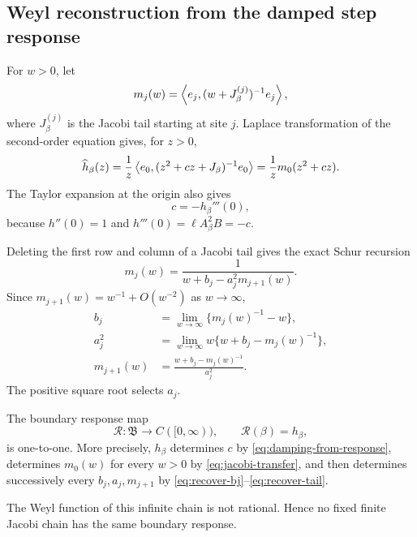 \subsection{Weyl reconstruction from the damped step response}

For \(w>0\), let
\[
 m_j(w)=\left\langle e_j,(w+J_\beta^{(j)})^{-1}e_j\right\rangle,
\]
where \(J_\beta^{(j)}\) is the Jacobi tail starting at site \(j\).  Laplace
transformation of the second-order equation gives, for \(z>0\),
\begin{equation}
 \widehat h_\beta(z)
 =\frac1z\left\langle e_0,(z^2+cz+J_\beta)^{-1}e_0\right\rangle
 =\frac1z m_0(z^2+cz).
 \label{eq:jacobi-transfer}
\end{equation}
The Taylor expansion at the origin also gives
\begin{equation}
 c=-h_\beta'''(0),
 \label{eq:damping-from-response}
\end{equation}
because \(h''(0)=1\) and \(h'''(0)=\ell A_\beta^2B=-c\).

Deleting the first row and column of a Jacobi tail gives the exact Schur
recursion
\begin{equation}
 m_j(w)=\frac1{w+b_j-a_j^2m_{j+1}(w)}.
 \label{eq:weyl-recursion}
\end{equation}
Since \(m_{j+1}(w)=w^{-1}+O(w^{-2})\) as \(w\to\infty\),
\begin{align}
 b_j&=\lim_{w\to\infty}\{m_j(w)^{-1}-w\},
 \label{eq:recover-bj}\\
 a_j^2&=\lim_{w\to\infty}
 w\{w+b_j-m_j(w)^{-1}\},
 \label{eq:recover-aj}\\
 m_{j+1}(w)&=\frac{w+b_j-m_j(w)^{-1}}{a_j^2}.
 \label{eq:recover-tail}
\end{align}
The positive square root selects \(a_j\).

\begin{theorem}
\label{thm:jacobi-reconstruction}
The boundary response map
\[
 \mathcal R:\mathfrak B\to C([0,\infty)),
 \qquad \mathcal R(\beta)=h_\beta,
\]
is one-to-one.  More precisely, \(h_\beta\) determines \(c\) by
\eqref{eq:damping-from-response}, determines \(m_0(w)\) for every \(w>0\) by
\eqref{eq:jacobi-transfer}, and then determines successively every
\(b_j,a_j,m_{j+1}\) by
\eqref{eq:recover-bj}--\eqref{eq:recover-tail}.

The Weyl function of this infinite chain is not rational.  Hence no fixed
finite Jacobi chain has the same boundary response.
\end{theorem}

